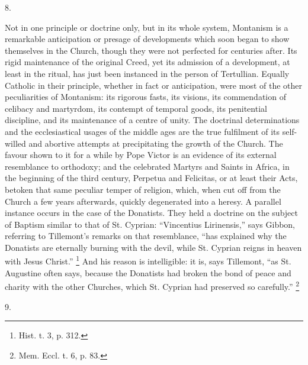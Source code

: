 8.

Not in one principle or doctrine only, but in its
whole system, Montanism is a remarkable anticipation or
presage of developments which soon began to show
themselves in the Church, though they were not perfected
for centuries after. Its rigid maintenance of the
original Creed, yet its admission of a development, at
least in the ritual, has just been instanced in the
person of Tertullian. Equally Catholic in their
principle, whether in fact or anticipation, were most of
the other peculiarities of Montanism: its rigorous fasts,
its visions, its commendation of celibacy and martyrdom,
its contempt of temporal goods, its penitential
discipline, and its maintenance of a centre of unity. The
doctrinal determinations and the ecclesiastical usages of
the middle ages are the true fulfilment of its
self-willed and abortive attempts at precipitating the
growth of the Church. The favour shown to it for a while
by Pope Victor is an evidence of its external resemblance
to orthodoxy; and the celebrated Martyrs and Saints in
Africa, in the beginning of the third century, Perpetua
and Felicitas, or at least their Acts, betoken that same
peculiar temper of religion, which, when cut off from the
Church a few years afterwards, quickly degenerated into a
heresy. A parallel instance occurs in the case of the
Donatists. They held a doctrine on the subject of Baptism
similar to that of St. Cyprian: ``Vincentius
Lirinensis,'' says Gibbon, referring to Tillemont's
remarks on that resemblance, ``has explained why the
Donatists are eternally burning with the devil, while St.
Cyprian reigns in heaven with Jesus Christ.'' \footnote{Hist. t. 3, p. 312.} And his reason
is intelligible: it is, says Tillemont, ``as St.
Augustine often says, because the Donatists had broken
the bond of peace and charity with the other Churches,
which St. Cyprian had preserved so carefully.'' \footnote{Mem. Eccl. t. 6, p. 83.}

9.

